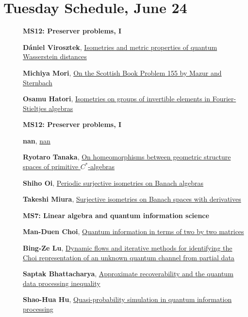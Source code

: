 \documentclass[ILAS2025-program.tex]{subfiles}
\begin{document}
\section*{Tuesday Schedule, June 24 }
        
        \begin{description}
    \item[] {\color{mstitle}\textbf{MS12: Preserver problems, I}} 
    \item[] \hypertarget{up0126}{}\textbf{Dániel Virosztek}, \hyperlink{down0126}{Isometries and metric properties of quantum Wasserstein distances}
        \item[] \hypertarget{up0127}{}\textbf{Michiya Mori}, \hyperlink{down0127}{On the Scottish Book Problem 155 by Mazur and Sternbach}
        \item[] \hypertarget{up0128}{}\textbf{Osamu Hatori}, \hyperlink{down0128}{Isometries on groups of invertible elements in Fourier-Stieltjes algebras}
        \end{description}
    \begin{description}
    \item[] {\color{mstitle}\textbf{MS12: Preserver problems, I}} 
    \item[] \hypertarget{up0161}{}\textbf{nan}, \hyperlink{down0161}{nan}
        \item[] \hypertarget{up0162}{}\textbf{Ryotaro Tanaka}, \hyperlink{down0162}{On homeomorphisms between geometric structure spaces of primitive $C^*$-algebras}
        \item[] \hypertarget{up0163}{}\textbf{Shiho Oi}, \hyperlink{down0163}{Periodic surjective isometries on Banach algebras}
        \item[] \hypertarget{up0164}{}\textbf{Takeshi Miura}, \hyperlink{down0164}{Surjective isometries on Banach spaces with derivatives}
        \end{description}
    \begin{description}
    \item[] {\color{mstitle}\textbf{MS7: Linear algebra and quantum information science}} 
    \item[] \hypertarget{up0205}{}\textbf{Man-Duen Choi}, \hyperlink{down0205}{Quantum information in terms of two by two matrices}
        \item[] \hypertarget{up0206}{}\textbf{Bing-Ze Lu}, \hyperlink{down0206}{Dynamic flows and iterative methods for identifying the Choi representation of an unknown quantum channel from partial data
}
        \item[] \hypertarget{up0207}{}\textbf{Saptak Bhattacharya}, \hyperlink{down0207}{Approximate recoverability and the quantum data processing inequality}
        \item[] \hypertarget{up0208}{}\textbf{Shao-Hua Hu}, \hyperlink{down0208}{Quasi-probability simulation in quantum information processing}
        \end{description}
\end{document}
